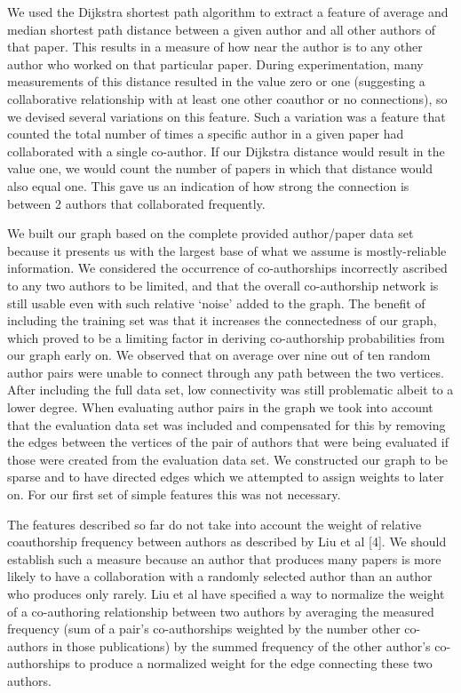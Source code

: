We used the Dijkstra shortest path algorithm to extract a feature of average and median shortest path distance between a given author and all other authors of that paper. This results in a measure of how near the author is to any other author who worked on that particular paper. During experimentation, many measurements of this distance resulted in the value zero or one (suggesting a collaborative  relationship with at least one other coauthor or no connections), so we devised several variations on this feature. Such a variation was a feature that counted the total number of times a specific author in a given paper had collaborated with a single co-author. If our Dijkstra distance would result in the value one, we would count the number of papers in which that distance would also equal one. This gave us an indication of how strong the connection is between 2 authors that collaborated frequently.

We built our graph based on the complete provided author/paper data set because it presents us with the largest base of what we assume is mostly-reliable information. We considered the occurrence of co-authorships incorrectly ascribed to any two authors to be limited, and that the overall co-authorship network is still usable even with such relative `noise’ added to the graph. The benefit of including the training set was that it increases the connectedness of our graph, which proved to be a limiting factor in deriving co-authorship probabilities from our graph early on. We observed that on average over nine out of ten random author pairs were unable to connect through any path between the two vertices. After including the full data set, low connectivity was still problematic albeit to a lower degree. When evaluating author pairs in the graph we took into account that the evaluation data set was included and compensated for this by removing the edges between the vertices of the pair of authors that were being evaluated if those were created from the evaluation data set.  We constructed our graph to be sparse and to have directed edges which we attempted to assign weights to later on. For our first set of simple features this was not necessary. 

The features described so far do not take into account the weight of relative coauthorship frequency between authors as described by Liu et al [4]. We should establish such a measure because an author that produces many papers is more likely to have a collaboration with a randomly selected author than an author who produces only rarely. Liu et al have specified a way to normalize the weight of a co-authoring relationship between two authors by averaging the measured frequency (sum of a pair’s co-authorships weighted by the number other co-authors in those publications) by the summed frequency of the other author’s co-authorships to produce a normalized weight for the edge connecting these two authors.

